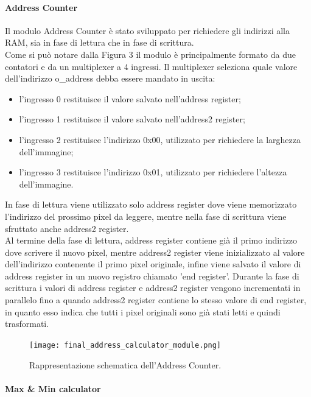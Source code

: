 \paragraph{Address Counter\\}

Il modulo Address Counter è stato sviluppato per richiedere gli indirizzi alla RAM, sia in fase di lettura che in fase di scrittura.\\
Come si può notare dalla Figura 3 il modulo è principalmente formato da due contatori e da un multiplexer a 4 ingressi. Il multiplexer seleziona quale valore dell'indirizzo o\_address debba essere mandato in uscita:
\begin{itemize}
    \item l'ingresso 0 restituisce il valore salvato nell'address register;
    \item l'ingresso 1 restituisce il valore salvato nell'address2 register;
    \item l'ingresso 2 restituisce l'indirizzo 0x00, utilizzato per richiedere la larghezza dell'immagine;
    \item l'ingresso 3 restituisce l'indirizzo 0x01, utilizzato per richiedere l'altezza dell'immagine.
\end{itemize}
In fase di lettura viene utilizzato solo address register dove viene memorizzato l'indirizzo del prossimo pixel da leggere, mentre nella fase di scrittura viene sfruttato anche address2 register.\\
Al termine della fase di lettura, address register contiene già il primo indirizzo dove scrivere il nuovo pixel, mentre address2 register viene inizializzato al valore dell'indirizzo contenente il primo pixel originale, infine viene salvato il valore di address register in un nuovo registro chiamato 'end register'.
Durante la fase di scrittura i valori di address register e address2 register vengono incrementati in parallelo fino a quando address2 register contiene lo stesso valore di end register, in quanto esso indica che tutti i pixel originali sono già stati letti e quindi trasformati.

\begin{figure}[h!]
\centering
\texttt{[image: final\_address\_calculator\_module.png]}%
\caption{Rappresentazione schematica dell'Address Counter.}
\end{figure}


\paragraph{Max \& Min calculator\\}

